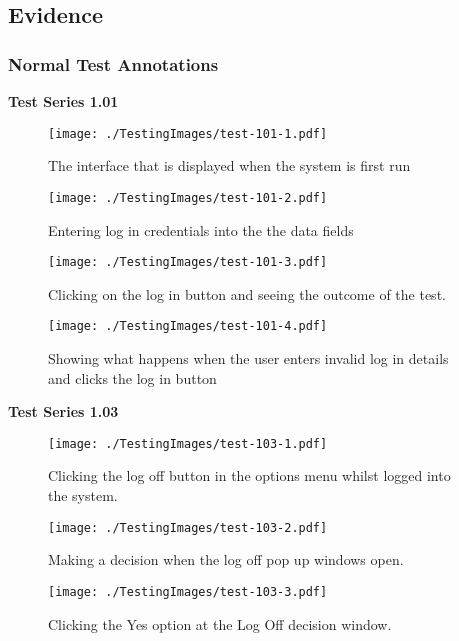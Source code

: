         
\subsection{Evidence}

\subsubsection{Normal Test Annotations}

\textbf{Test Series 1.01}

\begin{figure}[H]
    \texttt{[image: ./TestingImages/test-101-1.pdf]}
    \caption{The interface that is displayed when the system is first run} \label{fig:test-101-1}
\end{figure}

\begin{figure}[H]
    \texttt{[image: ./TestingImages/test-101-2.pdf]}
    \caption{Entering log in credentials into the the data fields} \label{fig:test-101-2}
\end{figure}

\begin{figure}[H]
    \texttt{[image: ./TestingImages/test-101-3.pdf]}
    \caption{Clicking on the log in button and seeing the outcome of the test.} \label{fig:test-101-3}
\end{figure}

\begin{figure}[H]
    \texttt{[image: ./TestingImages/test-101-4.pdf]}
    \caption{Showing what happens when the user enters invalid log in details and clicks the log in button} \label{fig:test-101-4}
\end{figure}


\textbf{Test Series 1.03}

\begin{figure}[H]
    \texttt{[image: ./TestingImages/test-103-1.pdf]}
    \caption{Clicking the log off button in the options menu whilst logged into the system.} \label{fig:test-103-1}
\end{figure}

\begin{figure}[H]
    \texttt{[image: ./TestingImages/test-103-2.pdf]}
    \caption{Making a decision when the log off pop up windows open.} \label{fig:test-103-2}
\end{figure}

\begin{figure}[H]
    \texttt{[image: ./TestingImages/test-103-3.pdf]}
    \caption{Clicking the Yes option at the Log Off decision window.} \label{fig:test-103-3}
\end{figure}

